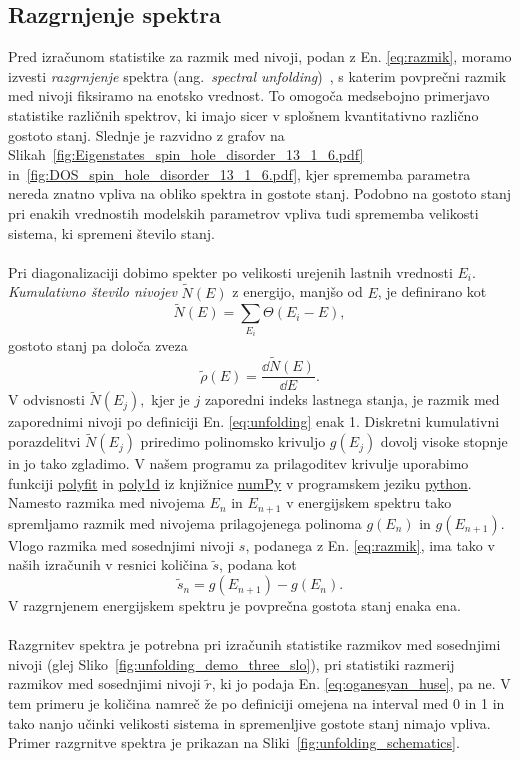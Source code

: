 \subsection{Razgrnjenje spektra}
\label{razgrnjenje}
Pred izračunom statistike za razmik med nivoji, podan z En. \eqref{eq:razmik}, moramo izvesti \emph{razgrnjenje} spektra (ang.~\emph{spectral unfolding})~\cite{abul2014unfolding}, s katerim povprečni razmik med nivoji fiksiramo na enotsko vrednost. To omogoča medsebojno primerjavo statistike različnih spektrov, ki imajo sicer v splošnem kvantitativno različno gostoto stanj. Slednje je razvidno z grafov na Slikah~\ref{fig:Eigenstates_spin_hole_disorder_13_1_6.pdf} in~\ref{fig:DOS_spin_hole_disorder_13_1_6.pdf}, kjer sprememba parametra nereda znatno vpliva na obliko spektra in gostote stanj. Podobno na gostoto stanj pri enakih vrednostih modelskih parametrov vpliva tudi sprememba velikosti sistema, ki spremeni število stanj. \\\\
Pri diagonalizaciji dobimo spekter po velikosti urejenih lastnih vrednosti $E_i$. \emph{Kumulativno število nivojev} $\tilde{N}(E)$ z energijo, manjšo od $E$, je definirano kot
\begin{equation}\label{eq:unfolding}
\tilde{N}(E)=\sum\limits_{E_i}\Theta(E_i-E),
\end{equation}
gostoto stanj pa določa zveza 
\begin{equation}\label{eq:DOS}
\tilde{\rho}(E)=\frac{\dd \tilde{N}(E)}{\dd E}.
\end{equation}
V odvisnosti $\tilde{N}(E_j),$ kjer je $j$ zaporedni indeks lastnega stanja, je razmik med zaporednimi nivoji po definiciji En. \eqref{eq:unfolding} enak 1. Diskretni kumulativni porazdelitvi $\tilde{N}(E_j)$ priredimo polinomsko krivuljo $g(E_j)$ dovolj visoke stopnje in jo tako zgladimo. V našem programu za prilagoditev krivulje uporabimo funkciji \url{polyfit} in \url{poly1d} iz knjižnice \url{numPy} v programskem jeziku \url{python}.
 Namesto razmika med nivojema $E_n$ in $E_{n+1}$ v energijskem spektru tako spremljamo razmik med nivojema prilagojenega polinoma $g(E_{n})$ in $g(E_{n+1})$. Vlogo razmika med sosednjimi nivoji $s$, podanega z En. \eqref{eq:razmik}, ima tako v naših izračunih v resnici količina $\tilde{s}$, podana kot
$$
\tilde{s}_n=g(E_{n+1})-g(E_n).
$$
V razgrnjenem energijskem spektru je povprečna gostota stanj enaka ena. \\\\
Razgrnitev spektra je potrebna pri izračunih statistike razmikov med sosednjimi nivoji (glej Sliko~\ref{fig:unfolding_demo_three_slo}), pri statistiki razmerij razmikov med sosednjimi nivoji $\tilde{r}$, ki jo podaja En. \eqref{eq:oganesyan_huse}, pa ne. V tem primeru je količina namreč že po definiciji omejena na interval med 0 in 1 in tako nanjo učinki velikosti sistema in spremenljive gostote stanj nimajo vpliva. Primer razgrnitve spektra je prikazan na Sliki~\ref{fig:unfolding_schematics}.
